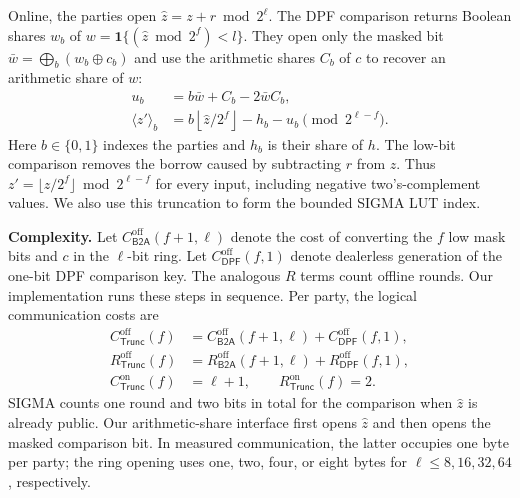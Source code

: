 \documentclass[journal]{IEEEtran}
\theoremstyle{definition}
\theoremstyle{plain}
\newcommand{\ashare}[1]{\langle #1 \rangle}             %
\newcommand{\ind}[1]{\mathbf{1}\{#1\}}
\begin{document}
Online, the parties open $\hat z=z+r\bmod 2^\ell$. The DPF comparison returns
Boolean shares $w_b$ of $w=\ind{(\hat z\bmod 2^f)<l}$. They open only the
masked bit $\bar w=\bigoplus_b(w_b\oplus c_b)$ and use the arithmetic shares
$C_b$ of $c$ to recover an arithmetic share of $w$:
\begin{equation}
\begin{aligned}
u_b&=b\bar w+C_b-2\bar w C_b,\\
\ashare{z'}_b
 &=b\left\lfloor\hat z/2^f\right\rfloor-h_b-u_b
   \pmod {2^{\ell-f}}.
\end{aligned}
\label{eq:trunc}
\end{equation}
Here $b\in\{0,1\}$ indexes the parties and $h_b$ is their share of $h$.
The low-bit comparison removes the borrow caused by subtracting $r$ from
$\hat z$. Thus $z'=\lfloor z/2^f\rfloor\bmod 2^{\ell-f}$ for every input,
including negative two's-complement values. We also use this truncation to
form the bounded SIGMA LUT index.

\textbf{Complexity.} Let $C^{\mathrm{off}}_{\mathsf{B2A}}(f+1,\ell)$ denote
the cost of converting the $f$ low mask bits and $c$ in the $\ell$-bit ring.
Let $C^{\mathrm{off}}_{\mathsf{DPF}}(f,1)$ denote dealerless generation of
the one-bit DPF comparison key. The analogous $R$ terms count offline rounds.
Our implementation runs these steps in sequence. Per party, the logical
communication costs are
\begin{equation}
\begin{aligned}
C^{\mathrm{off}}_{\mathsf{Trunc}}(f)
 &=C^{\mathrm{off}}_{\mathsf{B2A}}(f+1,\ell)
   +C^{\mathrm{off}}_{\mathsf{DPF}}(f,1),\\
R^{\mathrm{off}}_{\mathsf{Trunc}}(f)
 &=R^{\mathrm{off}}_{\mathsf{B2A}}(f+1,\ell)
   +R^{\mathrm{off}}_{\mathsf{DPF}}(f,1),\\
C^{\mathrm{on}}_{\mathsf{Trunc}}(f)&=\ell+1,\qquad
R^{\mathrm{on}}_{\mathsf{Trunc}}(f)=2.
\end{aligned}
\label{eq:trunc-cost}
\end{equation}
SIGMA counts one round and two bits in total for the comparison when $\hat z$
is already public. Our arithmetic-share interface first opens $\hat z$ and
then opens the masked comparison bit. In measured communication, the latter
occupies one byte per party; the ring opening uses one, two, four, or eight
bytes for $\ell\leq8,16,32,64$, respectively.
\end{document}

